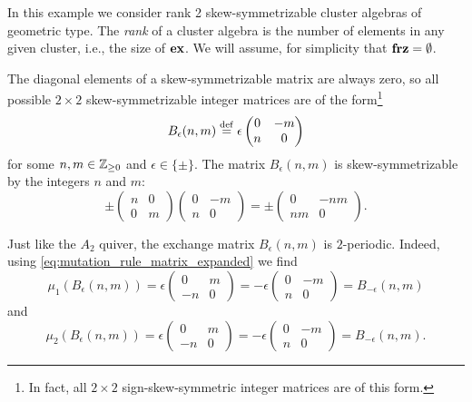 \begin{example}

	In this example we consider rank 2 skew-symmetrizable cluster algebras of geometric
	type. The \emph{rank} of a
	cluster algebra is the number of elements in any given cluster, i.e., the size of
	$\mathbf{ex}$. We will assume, for simplicity that $\mathbf{frz} = \emptyset$.

	The diagonal elements of a skew-symmetrizable matrix are always zero, so all possible
	$2\times2$ skew-symmetrizable integer matrices are of the form\footnote{In fact, all
		$2\times 2$ sign-skew-symmetric integer matrices are of this form.}
	\begin{equation*}
		B_\epsilon(n,m) \overset{\mathrm{def}}{=} \epsilon\begin{pmatrix}
			0 & -m \\
			n & 0
		\end{pmatrix}
	\end{equation*}
	for some $n,m \in \mathbb{Z}_{\geq 0}$ and $\epsilon \in \{\pm\}$. The matrix $B_\epsilon(n,
		m)$ is skew-symmetrizable by the integers $n$ and $m$:
	\begin{equation*}
		\pm
		\begin{pmatrix}
			n & 0 \\
			0 & m
		\end{pmatrix}
		\begin{pmatrix}
			0 & -m \\
			n & 0
		\end{pmatrix}
		= \pm \begin{pmatrix}
			0  & -nm \\
			nm & 0
		\end{pmatrix}.
	\end{equation*}

	Just like the $A_2$ quiver, the exchange matrix $B_\epsilon(n,m)$ is $2$-periodic.
	Indeed, using \cref{eq:mutation_rule_matrix_expanded} we find
	\begin{equation*}
		\mu_1(B_\epsilon(n,m)) = \epsilon\begin{pmatrix}
			0  & m \\
			-n & 0
		\end{pmatrix}
		= -\epsilon \begin{pmatrix}
			0 & -m \\
			n & 0
		\end{pmatrix}
		= B_{-\epsilon}(n, m)
	\end{equation*}
	and
	\begin{equation*}
		\mu_2(B_\epsilon(n,m)) = \epsilon\begin{pmatrix}
			0  & m \\
			-n & 0
		\end{pmatrix}
		= -\epsilon \begin{pmatrix}
			0 & -m \\
			n & 0
		\end{pmatrix}
		=  B_{-\epsilon}(n,m).
	\end{equation*}


\end{example}
